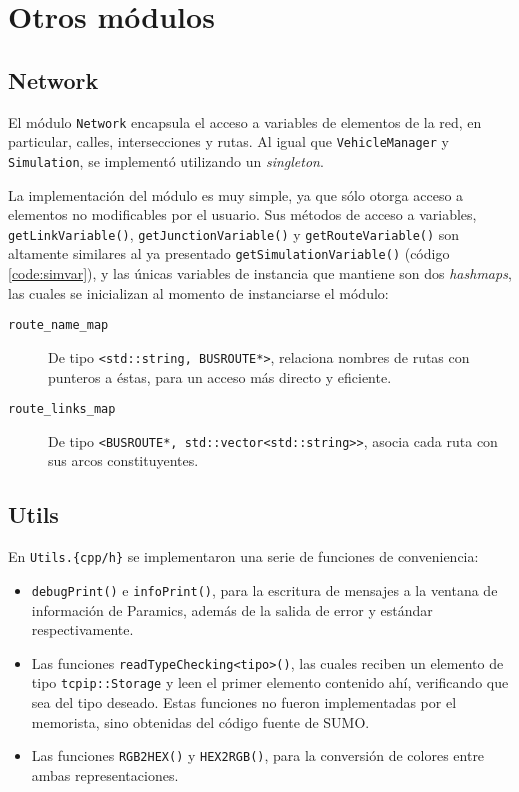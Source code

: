 \section{Otros módulos}\label{sec:miscmodules}

\subsection{Network}

El módulo \texttt{Network} encapsula el acceso a variables de elementos de la red, en particular, calles, intersecciones y rutas. Al igual que \texttt{VehicleManager} y \texttt{Simulation}, se implementó utilizando un \emph{singleton}. 

La implementación del módulo es muy simple, ya que sólo otorga acceso a elementos no modificables por el usuario. Sus métodos de acceso a variables, \texttt{getLinkVariable()}, \texttt{getJunctionVariable()} y \texttt{getRouteVariable()} son altamente similares al ya presentado \texttt{getSimulationVariable()} (código \ref{code:simvar}), y las únicas variables de instancia que mantiene son dos \emph{hashmaps}, las cuales se inicializan al momento de instanciarse el módulo:
\begin{description}
    \item [\texttt{route\_name\_map}] De tipo \texttt{<std::string, BUSROUTE*>}, relaciona nombres de rutas con punteros a éstas, para un acceso más directo y eficiente.
    
    \item [\texttt{route\_links\_map}] De tipo \texttt{<BUSROUTE*, std::vector<std::string>\@>}, asocia cada ruta con sus arcos constituyentes.
    
\end{description}

 

\subsection{Utils}

En \texttt{Utils.\{cpp/h\}} se implementaron una serie de funciones de conveniencia:
\begin{itemize}
    \item \texttt{debugPrint()} e \texttt{infoPrint()}, para la escritura de mensajes a la ventana de información de Paramics, además de la salida de error y estándar respectivamente.
    
    \item Las funciones \texttt{readTypeChecking<tipo>()}, las cuales reciben un elemento de tipo \texttt{tcpip::Storage} y leen el primer elemento contenido ahí, verificando que sea del tipo deseado. Estas funciones no fueron implementadas por el memorista, sino obtenidas del código fuente de SUMO.
    
    \item Las funciones \texttt{RGB2HEX()} y \texttt{HEX2RGB()}, para la conversión de colores entre ambas representaciones.
\end{itemize}

